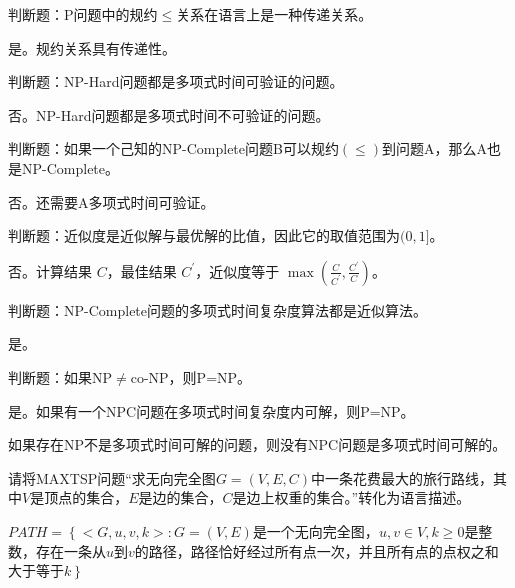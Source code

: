 \begin{problem}
	判断题：P问题中的规约$\le$关系在语言上是一种传递关系。
\end{problem}
\begin{solution}
	是。规约关系具有传递性。
\end{solution}



\begin{problem}
	判断题：NP-Hard问题都是多项式时间可验证的问题。
\end{problem}
\begin{solution}
	否。NP-Hard问题都是多项式时间不可验证的问题。
\end{solution}



\begin{problem}
	判断题：如果一个己知的NP-Complete问题B可以规约$(\le)$到问题A，那么A也是NP-Complete。
\end{problem}
\begin{solution}
	否。还需要A多项式时间可验证。
\end{solution}



\begin{problem}
	判断题：近似度是近似解与最优解的比值，因此它的取值范围为$(0,1]$。
\end{problem}
\begin{solution}
	否。计算结果 $C$，最佳结果 $C^\prime$，近似度等于 $\max(\frac{C}{C^\prime}, \frac{C^\prime}{C})$。
\end{solution}



\begin{problem}
	判断题：NP-Complete问题的多项式时间复杂度算法都是近似算法。
\end{problem}
\begin{solution}
	是。
\end{solution}



\begin{problem}
	判断题：如果NP$\neq$co-NP，则P=NP。
\end{problem}
\begin{solution}
	是。如果有一个NPC问题在多项式时间复杂度内可解，则P=NP。

	如果存在NP不是多项式时间可解的问题，则没有NPC问题是多项式时间可解的。
\end{solution}



\begin{problem}
	请将MAXTSP问题“求无向完全图$G=(V,E,C)$中一条花费最大的旅行路线，其中$V$是顶点的集合，$E$是边的集合，$C$是边上权重的集合。”转化为语言描述。
\end{problem}
\begin{solution}
	$PATH=\left\{<G,u,v,k>:G=(V,E)\right.$是一个无向完全图，$u,v\in V,k\ge 0$是整数，存在一条从$u$到$v$的路径，路径恰好经过所有点一次，并且所有点的点权之和大于等于$k\left.\right\}$
\end{solution}



